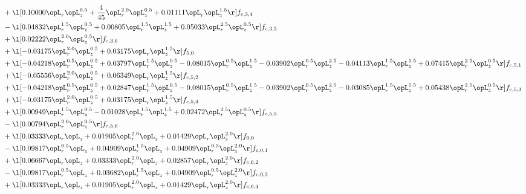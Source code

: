 \begin{alignat}{2}
& + \l[  0.10000 \opL_r \opL_z^{0.5} + \frac{4}{45} \opL_r^{2.0} \opL_z^{0.5} +  0.01111 \opL_r \opL_z^{1.5}  \r] f_{c,3,4} \nonumber \\ 
& - \l[  0.04832 \opL_r^{1.5} \opL_z^{0.5} +  0.00805 \opL_r^{1.5} \opL_z^{1.5} +  0.05033 \opL_r^{2.5} \opL_z^{0.5}  \r] f_{c,3,5} \nonumber \\ 
& + \l[  0.02222 \opL_r^{2.0} \opL_z^{0.5}  \r] f_{c,3,6} \nonumber \\ 
& + \l[  -0.03175 \opL_r^{2.0} \opL_z^{0.5} +  0.03175 \opL_r \opL_z^{1.5}  \r] f_{5,0} \nonumber \\ 
& + \l[  -0.04218 \opL_r^{0.5} \opL_z^{0.5} +  0.03797 \opL_r^{1.5} \opL_z^{0.5}   -0.08015 \opL_r^{0.5} \opL_z^{1.5}   -0.03902 \opL_r^{0.5} \opL_z^{2.5}   -0.04113 \opL_r^{1.5} \opL_z^{1.5} +  0.07415 \opL_r^{2.5} \opL_z^{0.5}  \r] f_{c,5,1} \nonumber \\ 
& + \l[  -0.05556 \opL_r^{2.0} \opL_z^{0.5} +  0.06349 \opL_r \opL_z^{1.5}  \r] f_{c,5,2} \nonumber \\ 
& + \l[  -0.04218 \opL_r^{0.5} \opL_z^{0.5} +  0.02847 \opL_r^{1.5} \opL_z^{0.5}   -0.08015 \opL_r^{0.5} \opL_z^{1.5}   -0.03902 \opL_r^{0.5} \opL_z^{2.5}   -0.03085 \opL_r^{1.5} \opL_z^{1.5} +  0.05438 \opL_r^{2.5} \opL_z^{0.5}  \r] f_{c,5,3} \nonumber \\ 
& + \l[  -0.03175 \opL_r^{2.0} \opL_z^{0.5} +  0.03175 \opL_r \opL_z^{1.5}  \r] f_{c,5,4} \nonumber \\ 
& + \l[  0.00949 \opL_r^{1.5} \opL_z^{0.5}   -0.01028 \opL_r^{1.5} \opL_z^{1.5} +  0.02472 \opL_r^{2.5} \opL_z^{0.5}  \r] f_{c,5,5} \nonumber \\ 
& - \l[  0.00794 \opL_r^{2.0} \opL_z^{0.5}  \r] f_{c,5,6} \nonumber \\ 
& + \l[  0.03333 \opL_r \opL_z +  0.01905 \opL_r^{2.0} \opL_z +  0.01429 \opL_r \opL_z^{2.0}  \r] f_{0,0} \nonumber \\ 
& - \l[  0.09817 \opL_r^{0.5} \opL_z +  0.04909 \opL_r^{1.5} \opL_z +  0.04909 \opL_r^{0.5} \opL_z^{2.0}  \r] f_{c,0,1} \nonumber \\ 
& + \l[  0.06667 \opL_r \opL_z +  0.03333 \opL_r^{2.0} \opL_z +  0.02857 \opL_r \opL_z^{2.0}  \r] f_{c,0,2} \nonumber \\ 
& - \l[  0.09817 \opL_r^{0.5} \opL_z +  0.03682 \opL_r^{1.5} \opL_z +  0.04909 \opL_r^{0.5} \opL_z^{2.0}  \r] f_{c,0,3} \nonumber \\ 
& + \l[  0.03333 \opL_r \opL_z +  0.01905 \opL_r^{2.0} \opL_z +  0.01429 \opL_r \opL_z^{2.0}  \r] f_{c,0,4} \nonumber \\ 

\end{alignat}
